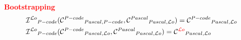 \documentclass[a4paper,11pt,hidelinks]{book}
\theoremstyle{definition}
\begin{document}
    \textcolor{red}{\textbf{Bootstrapping}}
    \begin{align*}
         & \mathcal{I}^{\mathcal{L}o}{_{P-code}}(\mathcal{C}^{P-code}{_{Pascal, P-code}},\mathcal{C}^{Pascal}{_{Pascal, \mathcal{L}o}}) = \mathcal{C}^{P-code}{_{Pascal, \mathcal{L}o}} \\
         & \mathcal{I}^{\mathcal{L}o}{_{P-code}}(\mathcal{C}^{P-code}{_{Pascal, \mathcal{L}o}},\mathcal{C}^{Pascal}{_{Pascal, \mathcal{L}o}}) = \mathcal{C}^{\textcolor{red}{\mathcal{L}o}}{_{Pascal, \mathcal{L}o}}
    \end{align*}
\end{document}
